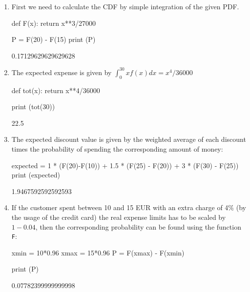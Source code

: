 \cprotEnv\begin{solution}
\begin{enumerate}[label={\emph{\alph*})}]
\tightlist
\item First we need to calculate the CDF by simple integration of the given PDF.
\begin{ipython}
def F(x):
    return x**3/27000

P = F(20) - F(15)
print (P)
\end{ipython}
\begin{ioutput}
0.17129629629629628
\end{ioutput}
\item The expected expense is given by $\int_{0}^{30} xf(x) dx = x^4/36000$
\begin{ipython}
def tot(x):
    return x**4/36000

print (tot(30))
\end{ipython}
\begin{ioutput}
22.5	
\end{ioutput}

\item The expected discount value is given by the weighted average of each discount times the probability of spending the corresponding amount of money:
\begin{ipython}
expected = 1 * (F(20)-F(10)) + 1.5 * (F(25) - F(20)) + 3 * (F(30) - F(25))
print (expected)
\end{ipython}
\begin{ioutput}
1.9467592592592593
\end{ioutput}

\item If the customer spent between 10 and 15 EUR with an extra charge of 4\% (by the usage of the credit card) the real expense limits has to be scaled by $1 - 0.04$, then the corresponding probability can be found using the function \texttt{F}:
\begin{ipython}
xmin = 10*0.96
xmax = 15*0.96
P = F(xmax) - F(xmin)

print (P)
\end{ipython}
\begin{ioutput}
0.07782399999999998
\end{ioutput}
\end{enumerate}
\end{solution}

